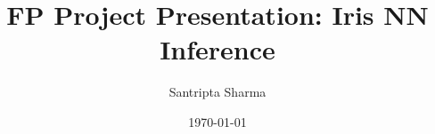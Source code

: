 \documentclass{beamer}
\title{FP Project Presentation: Iris NN Inference}
\author{Santripta Sharma}
\date{\today}
\begin{document}
\begin{frame}
	\titlepage
\end{frame}	
\end{document}
